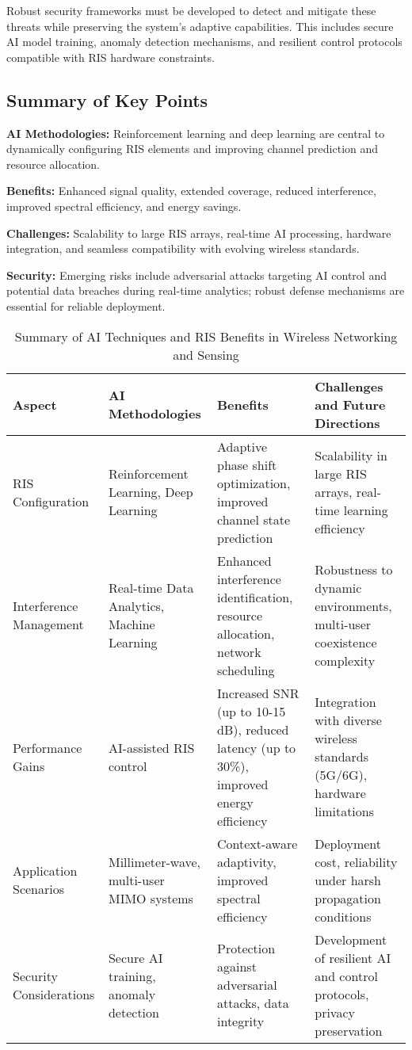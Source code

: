 \documentclass[sigconf]{acmart}
\begin{document}
Robust security frameworks must be developed to detect and mitigate these threats while preserving the system's adaptive capabilities. This includes secure AI model training, anomaly detection mechanisms, and resilient control protocols compatible with RIS hardware constraints.

\subsection{Summary of Key Points}

\noindent\textbf{AI Methodologies:} Reinforcement learning and deep learning are central to dynamically configuring RIS elements and improving channel prediction and resource allocation.

\noindent\textbf{Benefits:} Enhanced signal quality, extended coverage, reduced interference, improved spectral efficiency, and energy savings.

\noindent\textbf{Challenges:} Scalability to large RIS arrays, real-time AI processing, hardware integration, and seamless compatibility with evolving wireless standards.

\noindent\textbf{Security:} Emerging risks include adversarial attacks targeting AI control and potential data breaches during real-time analytics; robust defense mechanisms are essential for reliable deployment.

\begin{table*}[htbp]
\centering
\caption{Summary of AI Techniques and RIS Benefits in Wireless Networking and Sensing}
\label{tab:ai_ris_summary}
\begin{adjustbox}{max width=\textwidth}
\begin{tabular}{@{}llll@{}}
\toprule
\textbf{Aspect} & \textbf{AI Methodologies} & \textbf{Benefits} & \textbf{Challenges and Future Directions} \\ \midrule
RIS Configuration & Reinforcement Learning, Deep Learning & Adaptive phase shift optimization, improved channel state prediction & Scalability in large RIS arrays, real-time learning efficiency \\
Interference Management & Real-time Data Analytics, Machine Learning & Enhanced interference identification, resource allocation, network scheduling & Robustness to dynamic environments, multi-user coexistence complexity \\
Performance Gains & AI-assisted RIS control & Increased SNR (up to 10-15 dB), reduced latency (up to 30\%), improved energy efficiency & Integration with diverse wireless standards (5G/6G), hardware limitations \\
Application Scenarios & Millimeter-wave, multi-user MIMO systems & Context-aware adaptivity, improved spectral efficiency & Deployment cost, reliability under harsh propagation conditions \\
Security Considerations & Secure AI training, anomaly detection & Protection against adversarial attacks, data integrity & Development of resilient AI and control protocols, privacy preservation \\ \bottomrule
\end{tabular}
\end{adjustbox}
\end{table*}
\end{document}
